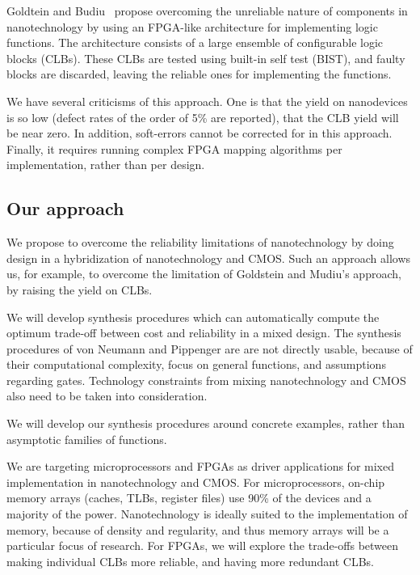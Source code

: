 Goldtein and Budiu~\cite{goldstein-nano-03} propose overcoming the unreliable nature of components
in nanotechnology by using an FPGA-like architecture for implementing logic
functions.  The architecture consists of a large ensemble of configurable logic
blocks (CLBs).  These CLBs are tested using built-in self test (BIST), and 
faulty blocks are discarded, leaving the reliable ones for implementing the functions.

We have several criticisms of this approach.  One is that the yield on
nanodevices is so low (defect rates of the order of 5\% are reported), that the
CLB yield will be near zero.  In addition, soft-errors cannot be corrected for
in this approach.  Finally, it requires running complex FPGA mapping algorithms
per implementation, rather than per design.

\subsection*{Our approach}


We propose to overcome the reliability limitations of nanotechnology
by doing design in a hybridization of nanotechnology and CMOS.  
Such an approach allows us, for example, to overcome the limitation of 
Goldstein and Mudiu's approach, by raising the yield on CLBs.   

We will develop synthesis procedures which can automatically
compute the optimum trade-off between cost and reliability in a mixed
design.  The synthesis procedures of von Neumann and Pippenger are
are not directly usable, because of their computational complexity, focus on general 
functions, and assumptions regarding gates.  Technology constraints from mixing nanotechnology and 
CMOS also need to be taken into consideration.

We will develop our synthesis procedures around concrete examples, 
rather than asymptotic families of functions. 

We are targeting microprocessors and FPGAs as driver applications
for mixed implementation in  nanotechnology and CMOS.  
For microprocessors, on-chip memory arrays (caches, TLBs, register files)
 use 90\% of the devices and a majority of the power.  Nanotechnology
is ideally suited to the implementation of memory, because of
density and regularity, and thus memory arrays will be a particular
focus of research.  For FPGAs, we will explore the trade-offs between making 
individual CLBs more reliable, and having more redundant CLBs. 





